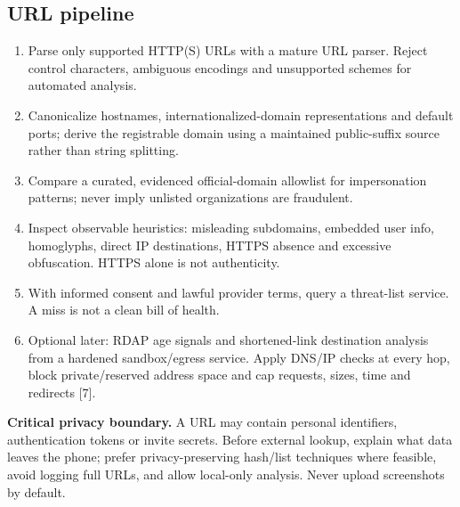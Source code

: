 \documentclass[10pt,a4paper]{article}
\begin{document}
\subsection{URL pipeline}
\begin{enumerate}
\item Parse only supported HTTP(S) URLs with a mature URL parser. Reject control characters, ambiguous encodings and unsupported schemes for automated analysis.
\item Canonicalize hostnames, internationalized-domain representations and default ports; derive the registrable domain using a maintained public-suffix source rather than string splitting.
\item Compare a curated, evidenced official-domain allowlist for impersonation patterns; never imply unlisted organizations are fraudulent.
\item Inspect observable heuristics: misleading subdomains, embedded user info, homoglyphs, direct IP destinations, HTTPS absence and excessive obfuscation. HTTPS alone is not authenticity.
\item With informed consent and lawful provider terms, query a threat-list service. A miss is not a clean bill of health.
\item Optional later: RDAP age signals and shortened-link destination analysis from a hardened sandbox/egress service. Apply DNS/IP checks at every hop, block private/reserved address space and cap requests, sizes, time and redirects [7].
\end{enumerate}
\begin{riskbox}
\textbf{Critical privacy boundary.} A URL may contain personal identifiers, authentication tokens or invite secrets. Before external lookup, explain what data leaves the phone; prefer privacy-preserving hash/list techniques where feasible, avoid logging full URLs, and allow local-only analysis. Never upload screenshots by default.
\end{riskbox}
\end{document}
